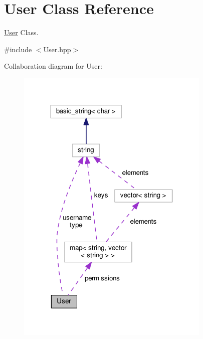 \hypertarget{class_user}{\section{User Class Reference}
\label{class_user}
}


\hyperlink{class_user}{User} Class.  




{\ttfamily \#include $<$User.\-hpp$>$}



Collaboration diagram for User\-:
\nopagebreak
\begin{figure}[H]
\begin{center}
\leavevmode
\includegraphics[width=262pt]{class_user__coll__graph}
\end{center}
\end{figure}
